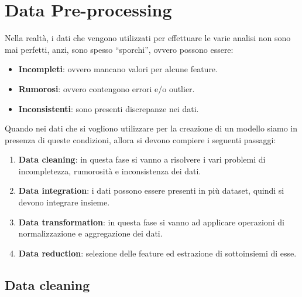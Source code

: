 \chapter{Data Pre-processing}
Nella realtà, i dati che vengono utilizzati per effettuare le varie analisi non
sono mai perfetti, anzi, sono spesso ``sporchi'', ovvero possono essere:
\begin{itemize}
    \item \textbf{Incompleti}: ovvero mancano valori per alcune feature.
    \item \textbf{Rumorosi}: ovvero contengono errori e/o outlier.
    \item \textbf{Inconsistenti}: sono presenti discrepanze nei dati.
\end{itemize}
Quando nei dati che si vogliono utilizzare per la creazione di un modello siamo
in presenza di queste condizioni, allora si devono compiere i seguenti passaggi:
\begin{enumerate}
    \item \textbf{Data cleaning}: in questa fase si vanno a risolvere i vari
          problemi di incompletezza, rumorosità e inconsistenza dei dati.
    \item \textbf{Data integration}: i dati possono essere presenti in più
          dataset, quindi si devono integrare insieme.
    \item \textbf{Data transformation}: in questa fase si vanno ad applicare
          operazioni di normalizzazione e aggregazione dei dati.
    \item \textbf{Data reduction}: selezione delle feature ed estrazione di
          sottoinsiemi di esse.
\end{enumerate}
\section{Data cleaning}
